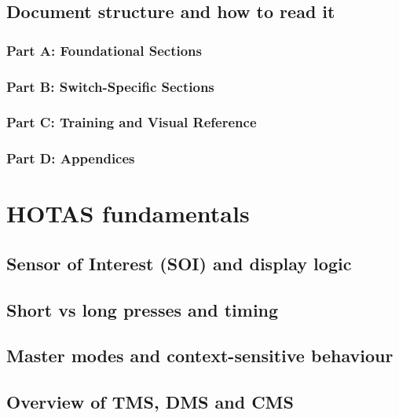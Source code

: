\documentclass[11pt,a4paper]{article}
\begin{document}
\subsection{Document structure and how to read it}

\subsubsection{Part A: Foundational Sections}


\subsubsection{Part B: Switch-Specific Sections}


\subsubsection{Part C: Training and Visual Reference}


\subsubsection{Part D: Appendices}

\section{HOTAS fundamentals}

\subsection{Sensor of Interest (SOI) and display logic}


\subsection{Short vs long presses and timing}


\subsection{Master modes and context-sensitive behaviour}


\subsection{Overview of TMS, DMS and CMS}
\end{document}
